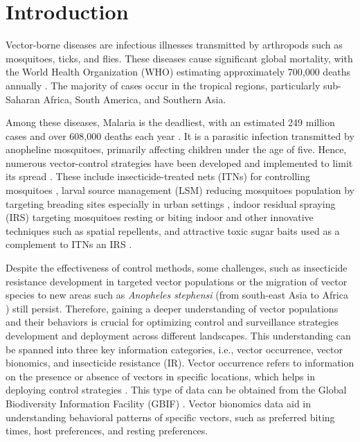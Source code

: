 \documentclass{article}
\begin{document}
\section{Introduction}
\label{sec:introduction}
\par
Vector-borne diseases are infectious illnesses transmitted by arthropods such as mosquitoes, ticks, and flies. 
These diseases cause significant global mortality, with the World Health Organization (WHO) estimating approximately 
700,000 deaths annually \citep{2024.WH.VD, 2019.RU.VD}. 
The majority of cases occur in the tropical regions, particularly sub-Saharan Africa, South America, and Southern Asia. 
\par
Among these diseases, Malaria is the deadliest, with an estimated 249 million cases and over 608,000 deaths each year \citep{2024.WH.VD}. 
It is a parasitic infection transmitted by anopheline mosquitoes, primarily affecting children under the age of five. 
Hence, numerous vector-control strategies have been developed and implemented to limit its spread \citep{2023.ST.ASR, 2016.AN.PPA}. 
These include insecticide-treated nets (ITNs) for controlling mosquitoes \citep{2024.AJ.TBO}, larval source management (LSM) reducing mosquitoes population by targeting breading sites especially in urban settings \citep{2024.NF.SUO}, indoor residual spraying (IRS) targeting mosquitoes resting 
or biting indoor \citep{2024.RA.FEO} and other innovative techniques such as spatial repellents, and attractive toxic sugar baits used as a complement 
to ITNs an IRS \citep{2024.KE.TPF}. 
\par
Despite the effectiveness of control methods, some challenges, such as insecticide resistance development in targeted vector populations \citep{2024.IS.IRO, 2024.SA.MAP} or the migration of vector species to new areas such as \textit{Anopheles stephensi} (from south-east Asia to Africa \citep{2024.QI.PPS}) still persist. 
Therefore, gaining a deeper understanding of vector populations and their behaviors is crucial for optimizing control and surveillance strategies development and deployment across different landscapes. 
This understanding can be spanned into three key information categories, i.e., vector occurrence, vector bionomics, and insecticide resistance (IR). 
Vector occurrence refers to information on the presence or absence of vectors in specific locations, which helps in deploying control strategies \citep{2010.ME.TDA, 2022.MI.UOA}. 
This type of data can be obtained from the Global Biodiversity Information Facility (GBIF) \citep{2011.AN.BIG}. 
Vector bionomics data aid in understanding behavioral patterns of specific vectors, such as preferred biting times, host preferences, and resting preferences. 
\end{document}
